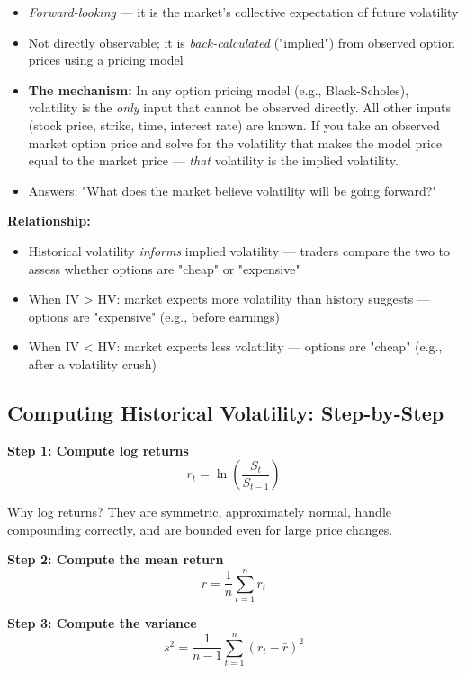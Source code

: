 \documentclass[12pt,openany]{book}
\theoremstyle{definition}
\theoremstyle{remark}
\begin{document}
\begin{itemize}
\item \emph{Forward-looking} --- it is the market's collective expectation of future volatility


\item Not directly observable; it is \emph{back-calculated} ("implied") from observed option prices using a pricing model


\item \textbf{The mechanism:} In any option pricing model (e.g., Black-Scholes), volatility is the \emph{only} input that cannot be observed directly. All other inputs (stock price, strike, time, interest rate) are known. If you take an observed market option price and solve for the volatility that makes the model price equal to the market price --- \emph{that} volatility is the implied volatility.


\item Answers: "What does the market believe volatility will be going forward?"


\end{itemize}
\textbf{Relationship:}

\begin{itemize}
\item Historical volatility \emph{informs} implied volatility --- traders compare the two to assess whether options are "cheap" or "expensive"


\item When IV > HV: market expects more volatility than history suggests --- options are "expensive" (e.g., before earnings)


\item When IV < HV: market expects less volatility --- options are "cheap" (e.g., after a volatility crush)


\end{itemize}
\medskip
\subsection{Computing Historical Volatility: Step-by-Step}
\textbf{Step 1: Compute log returns} \[
r_t = \ln\left(\frac{S_t}{S_{t-1}}\right)
\]

Why log returns? They are symmetric, approximately normal, handle compounding correctly, and are bounded even for large price changes.

\textbf{Step 2: Compute the mean return} \[
\bar{r} = \frac{1}{n} \sum_{t=1}^{n} r_t
\]

\textbf{Step 3: Compute the variance} \[
s^2 = \frac{1}{n-1} \sum_{t=1}^{n} (r_t - \bar{r})^2
\]
\end{document}
